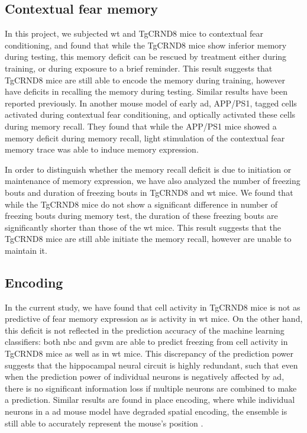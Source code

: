 \subsection{Contextual fear memory}

In this project, we subjected \gls{wt} and TgCRND8 mice to contextual fear conditioning, and found that while the TgCRND8 mice show inferior memory during testing, this memory deficit can be rescued by \tglu{} treatment either during training, or during exposure to a brief reminder. This result suggests that TgCRND8 mice are still able to encode the memory during training, however have deficits in recalling the memory during testing. Similar results have been reported previously. In another mouse model of early \gls{ad}, APP/PS1, \citet{roy16} tagged cells activated during contextual fear conditioning, and optically activated these cells during memory recall. They found that while the APP/PS1 mice showed a memory deficit during memory recall, light stimulation of the contextual fear memory trace was able to induce memory expression. 

In order to distinguish whether the memory recall deficit is due to initiation or maintenance of memory expression, we have also analyzed the number of freezing bouts and duration of freezing bouts in TgCRND8 and \gls{wt} mice. We found that while the TgCRND8 mice do not show a significant difference in number of freezing bouts during memory test, the duration of these freezing bouts are significantly shorter than those of the \gls{wt} mice. This result suggests that the TgCRND8 mice are still able initiate the memory recall, however are unable to maintain it. 

\subsection{Encoding}

In the current study, we have found that cell activity in TgCRND8 mice is not as predictive of fear memory expression as is activity in \gls{wt} mice. On the other hand, this deficit is not reflected in the prediction accuracy of the machine learning classifiers: both \gls{nbc} and \gls{gsvm} are able to predict freezing from cell activity in TgCRND8 mice as well as in \gls{wt} mice. This discrepancy of the prediction power suggests that the hippocampal neural circuit is highly redundant, such that even when the prediction power of individual neurons is negatively affected by \gls{ad}, there is no significant information loss if multiple neurons are combined to make a prediction. Similar results are found in place encoding, where while individual neurons in a \gls{ad} mouse model have degraded spatial encoding, the ensemble is still able to accurately represent the mouse's position \citep{cheng13}.  

